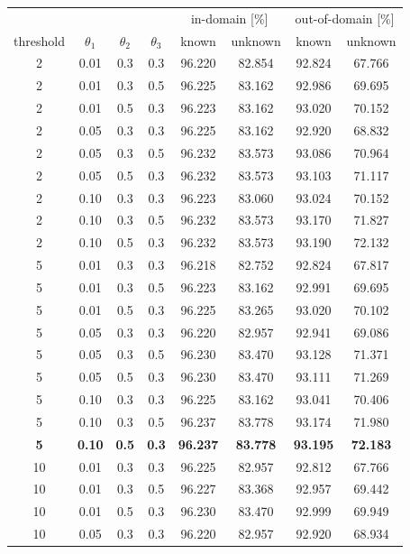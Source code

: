 \documentclass[11pt]{article}
\begin{document}
\begin{table}[phtb]
\begin{center}
\begin{tabular}{c ccc cccc}
\toprule
&&&& \multicolumn{2}{c}{in-domain [\%]} & \multicolumn{2}{c}{out-of-domain [\%]}\\
threshold & $\theta_1$ & $\theta_2$ & $\theta_3$ & known & unknown & known & unknown \\\midrule
2 & 0.01 & 0.3 & 0.3 & 96.220 & 82.854 & 92.824 & 67.766\\
2 & 0.01 & 0.3 & 0.5 & 96.225 & 83.162 & 92.986 & 69.695\\
2 & 0.01 & 0.5 & 0.3 & 96.223 & 83.162 & 93.020 & 70.152\\
2 & 0.05 & 0.3 & 0.3 & 96.225 & 83.162 & 92.920 & 68.832\\
2 & 0.05 & 0.3 & 0.5 & 96.232 & 83.573 & 93.086 & 70.964\\
2 & 0.05 & 0.5 & 0.3 & 96.232 & 83.573 & 93.103 & 71.117\\
2 & 0.10 & 0.3 & 0.3 & 96.223 & 83.060 & 93.024 & 70.152\\
2 & 0.10 & 0.3 & 0.5 & 96.232 & 83.573 & 93.170 & 71.827\\
2 & 0.10 & 0.5 & 0.3 & 96.232 & 83.573 & 93.190 & 72.132\\
5 & 0.01 & 0.3 & 0.3 & 96.218 & 82.752 & 92.824 & 67.817\\
5 & 0.01 & 0.3 & 0.5 & 96.223 & 83.162 & 92.991 & 69.695\\
5 & 0.01 & 0.5 & 0.3 & 96.225 & 83.265 & 93.020 & 70.102\\
5 & 0.05 & 0.3 & 0.3 & 96.220 & 82.957 & 92.941 & 69.086\\
5 & 0.05 & 0.3 & 0.5 & 96.230 & 83.470 & 93.128 & 71.371\\
5 & 0.05 & 0.5 & 0.3 & 96.230 & 83.470 & 93.111 & 71.269\\
5 & 0.10 & 0.3 & 0.3 & 96.225 & 83.162 & 93.041 & 70.406\\
5 & 0.10 & 0.3 & 0.5 & 96.237 & 83.778 & 93.174 & 71.980\\
{\bf 5} & {\bf 0.10} & {\bf 0.5} & {\bf 0.3} & {\bf 96.237} & {\bf 83.778} &
{\bf 93.195} & {\bf 72.183}\\
10 & 0.01 & 0.3 & 0.3 & 96.225 & 82.957 & 92.812 & 67.766\\
10 & 0.01 & 0.3 & 0.5 & 96.227 & 83.368 & 92.957 & 69.442\\
10 & 0.01 & 0.5 & 0.3 & 96.230 & 83.470 & 92.999 & 69.949\\
10 & 0.05 & 0.3 & 0.3 & 96.220 & 82.957 & 92.920 & 68.934\\

\end{tabular}
\end{center}
\end{table}
\end{document}
